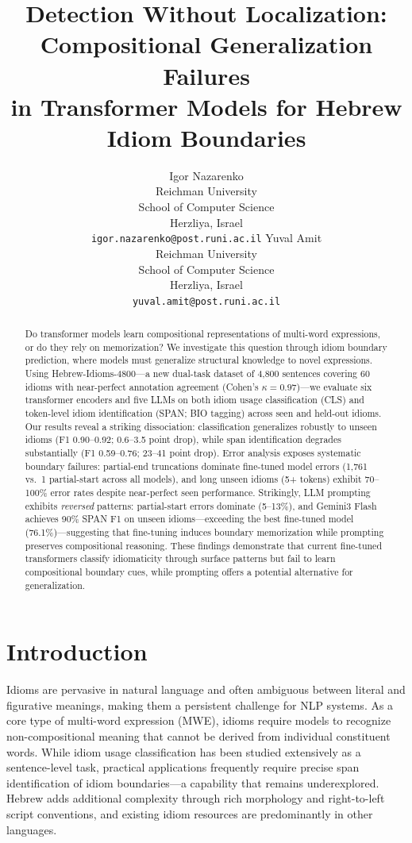 \documentclass[11pt]{article}
\title{Detection Without Localization: Compositional Generalization Failures\\in Transformer Models for Hebrew Idiom Boundaries}
\author{
  Igor Nazarenko \\
  Reichman University \\
  School of Computer Science \\
  Herzliya, Israel \\
  \texttt{igor.nazarenko@post.runi.ac.il}
  \And
  Yuval Amit \\
  Reichman University \\
  School of Computer Science \\
  Herzliya, Israel \\
  \texttt{yuval.amit@post.runi.ac.il}
}
\begin{document}
\maketitle

\begin{abstract}
Do transformer models learn compositional representations of multi-word expressions, or do they rely on memorization? We investigate this question through idiom boundary prediction, where models must generalize structural knowledge to novel expressions. Using Hebrew-Idioms-4800---a new dual-task dataset of 4,800 sentences covering 60 idioms with near-perfect annotation agreement (Cohen's $\kappa = 0.97$)---we evaluate six transformer encoders and five LLMs on both idiom usage classification (CLS) and token-level idiom identification (SPAN; BIO tagging) across seen and held-out idioms. Our results reveal a striking dissociation: classification generalizes robustly to unseen idioms (F1 0.90--0.92; 0.6--3.5 point drop), while span identification degrades substantially (F1 0.59--0.76; 23--41 point drop). Error analysis exposes systematic boundary failures: partial-end truncations dominate fine-tuned model errors (1,761 vs.\ 1 partial-start across all models), and long unseen idioms (5+ tokens) exhibit 70--100\% error rates despite near-perfect seen performance. Strikingly, LLM prompting exhibits \textit{reversed} patterns: partial-start errors dominate (5--13\%), and Gemini3 Flash achieves 90\% SPAN F1 on unseen idioms---exceeding the best fine-tuned model (76.1\%)---suggesting that fine-tuning induces boundary memorization while prompting preserves compositional reasoning. These findings demonstrate that current fine-tuned transformers classify idiomaticity through surface patterns but fail to learn compositional boundary cues, while prompting offers a potential alternative for generalization.
\end{abstract}

\section{Introduction}

Idioms are pervasive in natural language and often ambiguous between literal and figurative meanings, making them a persistent challenge for NLP systems. As a core type of multi-word expression (MWE), idioms require models to recognize non-compositional meaning that cannot be derived from individual constituent words. While idiom usage classification has been studied extensively as a sentence-level task, practical applications frequently require precise span identification of idiom boundaries---a capability that remains underexplored. Hebrew adds additional complexity through rich morphology and right-to-left script conventions, and existing idiom resources are predominantly in other languages.
\end{document}
